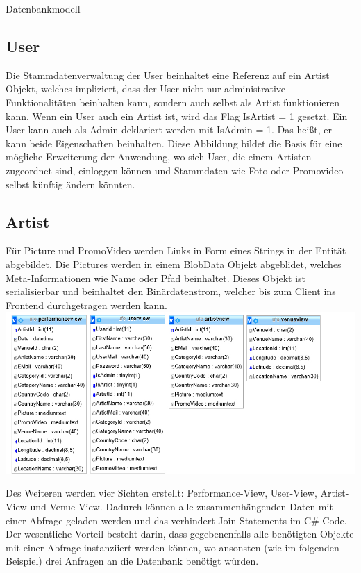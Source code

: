 \begin{section}{Datenbankmodell}
\subsection{User}
Die Stammdatenverwaltung der User beinhaltet eine Referenz auf ein Artist Objekt, welches impliziert, dass der User nicht nur administrative Funktionalitäten beinhalten kann, sondern auch selbst als Artist funktionieren kann.
Wenn ein User auch ein Artist ist, wird das Flag IsArtist = 1 gesetzt.
Ein User kann auch als Admin deklariert werden mit IsAdmin = 1. Das heißt, er kann beide Eigenschaften beinhalten.
Diese Abbildung bildet die Basis für eine mögliche Erweiterung der Anwendung, wo sich User, die einem Artisten zugeordnet sind, einloggen können und Stammdaten wie Foto oder Promovideo selbst künftig ändern könnten.

\subsection{Artist}
Für Picture und PromoVideo werden Links in Form eines Strings in der Entität abgebildet. Die Pictures werden in einem BlobData Objekt abgeblidet, welches Meta-Informationen wie Name oder Pfad beinhaltet. Dieses Objekt ist serialisierbar und beinhaltet den Binärdatenstrom, welcher bis zum Client ins Frontend durchgetragen werden kann. \\

\includegraphics[angle=0, scale=0.45]{./img/databaseViews.jpg}
\FloatBarrier

\nPar

Des Weiteren werden vier Sichten erstellt: Performance-View, User-View, Artist-View und Venue-View. Dadurch können alle zusammenhängenden Daten mit einer Abfrage geladen werden und das verhindert Join-Statements im C\# Code.
Der wesentliche Vorteil besteht darin, dass gegebenenfalls alle benötigten Objekte mit einer Abfrage instanziiert werden können, wo ansonsten (wie im folgenden Beispiel) drei Anfragen an die Datenbank benötigt würden.


\end{section}
